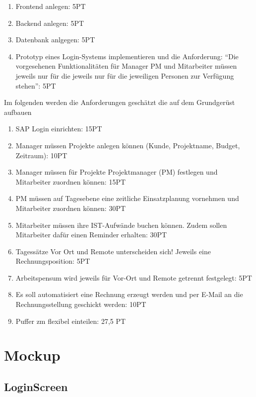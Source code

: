 \documentclass{article}
\begin{document}
    \begin{enumerate}
        \item Frontend anlegen: 5PT
        \item Backend anlegen: 5PT
        \item Datenbank anlgegen: 5PT
        \item Prototyp eines Login-Systems implementieren und die Anforderung: “Die vorgesehenen Funktionalitäten für Manager PM und Mitarbeiter müssen jeweils nur für die jeweils nur für die jeweiligen Personen zur Verfügung stehen”: 5PT
    \end{enumerate}

    Im folgenden werden die Anforderungen geschätzt die auf dem Grundgerüst aufbauen

    \begin{enumerate}
        \item SAP Login einrichten: 15PT
        \item Manager müssen Projekte anlegen können (Kunde, Projektname, Budget, Zeitraum): 10PT
        \item Manager müssen für Projekte Projektmanager (PM) festlegen und Mitarbeiter zuordnen können: 15PT
        \item PM müssen auf Tagesebene eine zeitliche Einsatzplanung vornehmen und Mitarbeiter zuordnen können: 30PT
        \item Mitarbeiter müssen ihre IST-Aufwände buchen können. Zudem sollen Mitarbeiter dafür einen Reminder erhalten: 30PT
        \item Tagessätze Vor Ort und Remote unterscheiden sich! Jeweils eine Rechnungsposition: 5PT
        \item Arbeitspensum wird jeweils für Vor-Ort und Remote getrennt festgelegt: 5PT
        \item Es soll automatisiert eine Rechnung erzeugt werden und per E-Mail an die Rechnungsstellung geschickt werden: 10PT
        \item Puffer zm flexibel einteilen: 27,5 PT


    \end{enumerate}

\newpage

\section{Mockup}
\subsection{LoginScreen}
\end{document}
